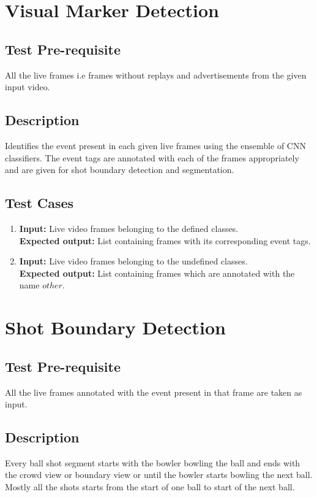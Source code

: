 \section{Visual Marker Detection}
\subsection{Test Pre-requisite}
All the live frames i.e frames without replays and advertisements from the given input video.
\subsection{Description}
Identifies the event present in each given live frames using the ensemble of CNN classifiers. The event tags are annotated with each of the frames appropriately and are given for shot boundary detection and segmentation.
\subsection{Test Cases}
\begin{enumerate}
\item \textbf{Input: }Live video frames belonging to the defined classes. \\
 \indent\textbf{Expected output: }List containing frames with its corresponding event tags.\\
\item \textbf{Input: }Live video frames belonging to the undefined classes. \\
 \indent\textbf{Expected output: }List containing frames which are annotated with the name $other$.\\
\end{enumerate}

\section{Shot Boundary Detection}
\subsection{Test Pre-requisite}
All the live frames annotated with the event present in that frame are taken as input.
\subsection{Description}
Every ball shot segment starts with the bowler bowling the ball and ends with the crowd view or boundary view or until the bowler starts bowling the next ball. Mostly all the shots starts from the start of one ball to start of the next ball.
